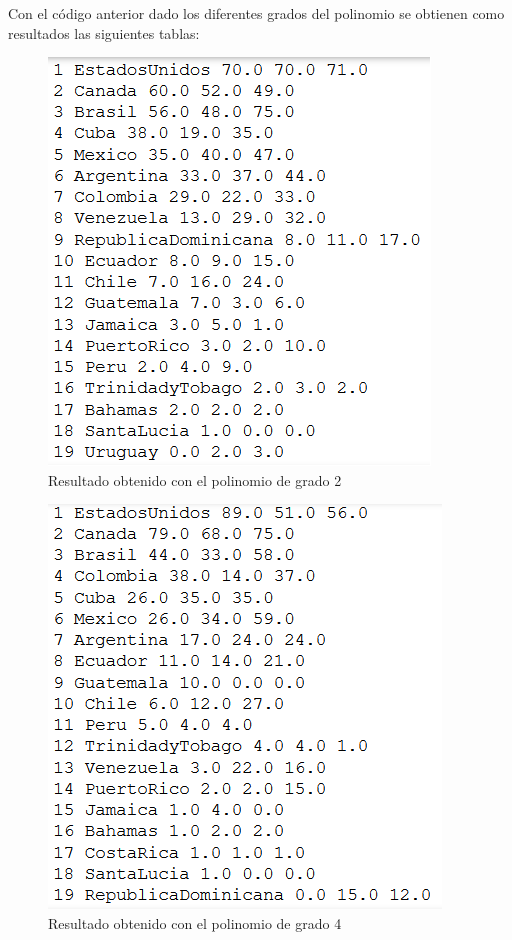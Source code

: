 \documentclass[a4paper,12pt]{article}
\begin{document}
\cline{-} Con el c\'{o}digo anterior dado los diferentes grados del polinomio se obtienen como resultados las siguientes tablas:
\begin{figure}[hbtp]
\caption{Resultado obtenido con el polinomio de grado 2}
\centering
\includegraphics[scale=1]{19_primeros_polinomio_grado_2.png}
\end{figure}
\begin{figure}[hbtp]
\caption{Resultado obtenido con el polinomio de grado 4}
\centering
\includegraphics[scale=1]{19_primeros_polinomio_grado_4.png}
\end{figure}
\end{document}

